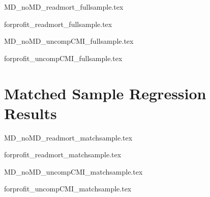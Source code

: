 \documentclass[12pt]{article}
\begin{document}
{MD_noMD_readmort_fullsample.tex}

{forprofit_readmort_fullsample.tex}

{MD_noMD_uncompCMI_fullsample.tex}

{forprofit_uncompCMI_fullsample.tex}

\section{Matched Sample Regression Results}

{MD_noMD_readmort_matchsample.tex}

{forprofit_readmort_matchsample.tex}

{MD_noMD_uncompCMI_matchsample.tex}

{forprofit_uncompCMI_matchsample.tex}



    

    

    

    

    

    

	
	
	
\end{document}
